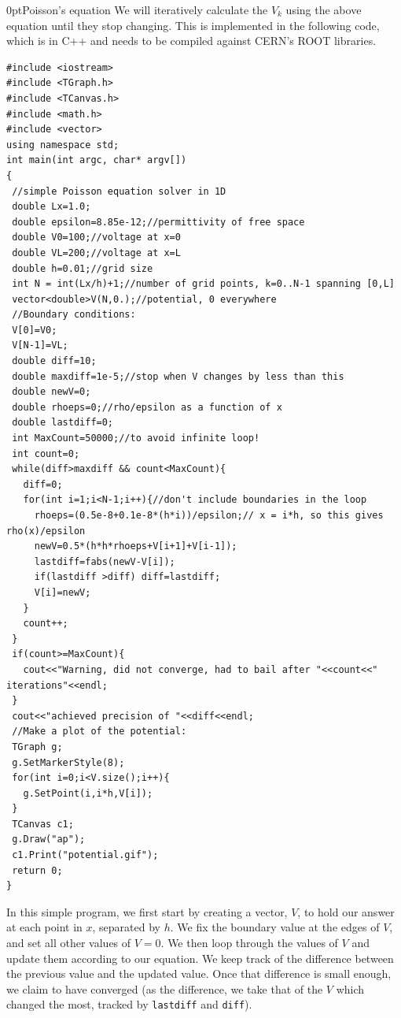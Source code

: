 \begin{example}{0pt}{Poisson's equation}{}
We will iteratively calculate the $V_k$ using the above equation until they stop changing. This is implemented in the following code, which is in C++ and needs to be compiled against CERN's ROOT libraries.
\begin{verbatim}
#include <iostream>
#include <TGraph.h>
#include <TCanvas.h>
#include <math.h>
#include <vector>
using namespace std;
int main(int argc, char* argv[])
{
 //simple Poisson equation solver in 1D
 double Lx=1.0;
 double epsilon=8.85e-12;//permittivity of free space
 double V0=100;//voltage at x=0
 double VL=200;//voltage at x=L
 double h=0.01;//grid size
 int N = int(Lx/h)+1;//number of grid points, k=0..N-1 spanning [0,L]
 vector<double>V(N,0.);//potential, 0 everywhere
 //Boundary conditions:
 V[0]=V0;
 V[N-1]=VL;
 double diff=10;
 double maxdiff=1e-5;//stop when V changes by less than this
 double newV=0;
 double rhoeps=0;//rho/epsilon as a function of x
 double lastdiff=0;
 int MaxCount=50000;//to avoid infinite loop!
 int count=0;
 while(diff>maxdiff && count<MaxCount){
   diff=0;
   for(int i=1;i<N-1;i++){//don't include boundaries in the loop
     rhoeps=(0.5e-8+0.1e-8*(h*i))/epsilon;// x = i*h, so this gives rho(x)/epsilon
     newV=0.5*(h*h*rhoeps+V[i+1]+V[i-1]);
     lastdiff=fabs(newV-V[i]);
     if(lastdiff >diff) diff=lastdiff;
     V[i]=newV;
   }
   count++;
 }
 if(count>=MaxCount){
   cout<<"Warning, did not converge, had to bail after "<<count<<" iterations"<<endl;
 }
 cout<<"achieved precision of "<<diff<<endl;
 //Make a plot of the potential:
 TGraph g;
 g.SetMarkerStyle(8);
 for(int i=0;i<V.size();i++){
   g.SetPoint(i,i*h,V[i]);
 }
 TCanvas c1;
 g.Draw("ap");
 c1.Print("potential.gif");
 return 0;
}
\end{verbatim}
In this simple program, we first start by creating a vector, $V$, to hold our answer at each point in $x$, separated by $h$. We fix the boundary value at the edges of $V$, and set all other values of $V=0$. We then loop through the values of $V$ and update them according to our equation. We keep track of the difference between the previous value and the updated value. Once that difference is small enough, we claim to have converged (as the difference, we take that of the $V$ which changed the most, tracked by \texttt{lastdiff} and \texttt{diff}).
\end{example}
